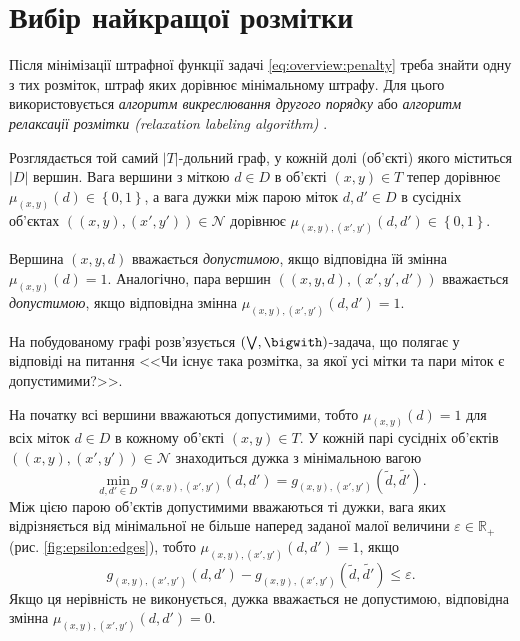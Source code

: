 \section{Вибір найкращої розмітки}

Після мінімізації штрафної функції задачі \eqref{eq:overview:penalty}
треба знайти одну з тих розміток, штраф яких дорівнює мінімальному штрафу.
Для цього використовується
\textit{алгоритм викреслювання другого порядку} або
\textit{алгоритм релаксації розмітки (relaxation labeling algorithm)}
\cite{overview:savchynskyy:diffusion}.

Розглядається той самий $\left| T \right|$-дольний граф,
у кожній долі (об'єкті) якого міститься $\left| D \right|$ вершин.
Вага вершини з міткою $d \in D$ в об'єкті $\left(x, y \right) \in T$
тепер дорівнює
$\mu_{\left(x, y \right)} \left( d \right) \in \left\{ 0, 1 \right\}$,
а вага дужки між парою міток $d, d' \in D$ в сусідніх об'єктах
$\left( \left( x, y \right), \left(x', y' \right) \right) \in \mathcal{N}$
дорівнює
$\mu_{\left(x, y \right), \left(x', y' \right)} \left(d, d' \right) \in
    \left\{ 0, 1 \right\}$.

Вершина $\left(x, y, d \right)$ вважається \textit{допустимою},
якщо відповідна їй змінна $\mu_{\left(x, y \right)} \left( d \right) = 1$.
Аналогічно,
пара вершин $\left( \left( x, y, d \right), \left(x', y', d' \right) \right)$
вважається \textit{допустимою}, якщо відповідна змінна
$\mu_{\left(x, y \right), \left(x', y' \right)} \left(d, d' \right) = 1$.

На побудованому графі розв'язується
$\left( \bigvee, \bigwith \right)$-задача, що полягає у відповіді на питання
<<Чи існує така розмітка, за якої усі мітки та пари міток є допустимими?>>.

На початку всі вершини вважаються допустимими, тобто
$\mu_{\left(x, y \right)} \left(d \right) = 1$ для всіх
міток $d \in D$ в кожному об'єкті $\left(x, y \right) \in T$.
У кожній парі сусідніх об'єктів
$\left( \left(x, y \right), \left(x', y' \right) \right) \in \mathcal{N}$
знаходиться дужка з мінімальною вагою
\begin{equation*}
\min \limits_{d, d' \in D} g_{\left(x, y \right), \left(x', y' \right)}
    \left(d, d' \right) =
    g_{\left(x, y \right), \left(x', y' \right)}
        \left(\tilde{d}, \tilde{d'} \right).
\end{equation*}
Між цією парою об'єктів допустимими вважаються ті дужки,
вага яких відрізняється від мінімальної не більше
наперед заданої малої величини $\varepsilon \in \mathbb{R}_+$
(рис. \ref{fig:epsilon:edges}), тобто
$\mu_{\left(x, y \right), \left(x', y' \right)} \left(d, d' \right) = 1$,
якщо
\begin{equation*}
    g_{\left(x, y \right), \left(x', y' \right)} \left(d, d' \right) -
    g_{\left(x, y \right), \left(x', y' \right)}
        \left(\tilde{d}, \tilde{d'} \right) \le
    \varepsilon.
\end{equation*}
Якщо ця нерівність не виконується, дужка вважається не допустимою,
відповідна змінна
$\mu_{\left(x, y \right), \left(x', y' \right)} \left(d, d' \right) = 0$.

